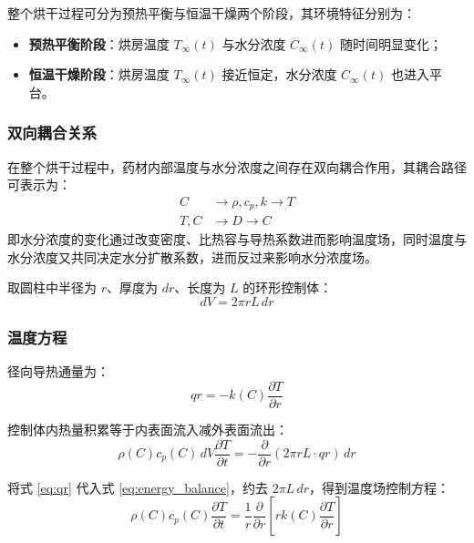 \documentclass[withoutpreface,bwprint]{cumcm_thesis}
\begin{document}
整个烘干过程可分为预热平衡与恒温干燥两个阶段，其环境特征分别为：
\begin{itemize}
    \item \textbf{预热平衡阶段}：烘房温度 \(T_\infty(t)\) 与水分浓度 \(C_\infty(t)\) 随时间明显变化；
    \item \textbf{恒温干燥阶段}：烘房温度 \(T_\infty(t)\) 接近恒定，水分浓度 \(C_\infty(t)\) 也进入平台。
\end{itemize}

\subsubsection{双向耦合关系}

在整个烘干过程中，药材内部温度与水分浓度之间存在双向耦合作用，其耦合路径可表示为：
\begin{align*}
    C &\rightarrow \rho, c_p, k \rightarrow T \\
    T, C &\rightarrow D \rightarrow C
\end{align*}
即水分浓度的变化通过改变密度、比热容与导热系数进而影响温度场，同时温度与水分浓度又共同决定水分扩散系数，进而反过来影响水分浓度场。

取圆柱中半径为 \(r\)、厚度为 \(dr\)、长度为 \(L\) 的环形控制体：
\begin{equation}
    dV = 2\pi r L \, dr
\end{equation}

\subsubsection{温度方程}

径向导热通量为：
\begin{equation}
    qr = -k(C)\frac{\partial T}{\partial r}
    \label{eq:qr}
\end{equation}

控制体内热量积累等于内表面流入减外表面流出：
\begin{equation}
    \rho(C) c_p(C) \, dV \frac{\partial T}{\partial t} = -\frac{\partial}{\partial r}(2\pi r L \cdot qr) \, dr
    \label{eq:energy_balance}
\end{equation}

将式 \eqref{eq:qr} 代入式 \eqref{eq:energy_balance}，约去 \(2\pi L \, dr\)，得到温度场控制方程：
\begin{equation}
    \rho(C) c_p(C) \frac{\partial T}{\partial t} = \frac{1}{r}\frac{\partial}{\partial r}\left[r k(C)\frac{\partial T}{\partial r}\right]
    \label{eq:temp_control}
\end{equation}
\end{document}
